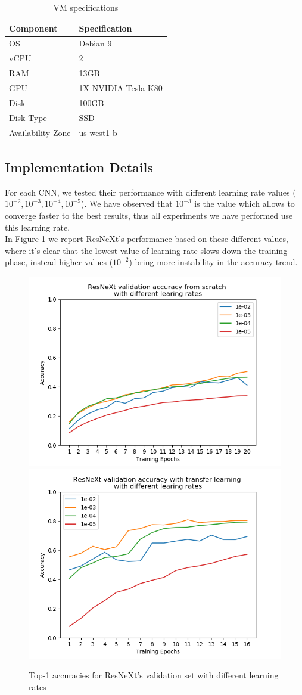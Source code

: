 \documentclass{article}
\begin{document}
\begin{table}[h]
	\centering
	\begin{tabular}{|l|l|} 
		\hline
		\textbf{Component} & \textbf{Specification}  \\ 
		\hline
		OS                 & Debian 9                \\
		vCPU               & 2                       \\
		RAM                & 13GB                    \\
		GPU                & 1X NVIDIA Tesla K80     \\
		Disk               & 100GB                   \\
		Disk Type          & SSD                     \\
		Availability Zone  & us-west1-b              \\
		\hline
	\end{tabular}
	\caption{VM specifications}
   	\label{tab:specVM}
\end{table}

\subsection{Implementation Details}\label{ImplDet}

For each CNN, we tested their performance with different learning rate values ($10^{-2}, 10^{-3}, 10^{-4}, 10^{-5}$). We have observed that $10^{-3}$ is the value which allows to converge faster to the best results, thus all experiments we have performed use this learning rate.\\
In Figure \ref{fig:lr} we report ResNeXt's performance based on these different values, where it's clear that the lowest value of learning rate slows down the training phase, instead higher values ($10^{-2}$) bring more instability in the accuracy trend.

\begin{figure}[h]
	\centering
	\includegraphics[width=.5\textwidth]{graphs/lr_scratch}\hfill
	\includegraphics[width=.5\textwidth]{graphs/lr_tl}
	\caption{Top-1 accuracies for ResNeXt's validation set with different learning rates}
	\label{fig:lr}
\end{figure}
\end{document}
